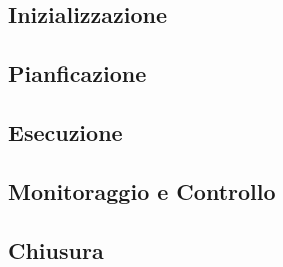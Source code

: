 \subsection{Inizializzazione}


\subsection{Pianficazione}


\subsection{Esecuzione}


\subsection{Monitoraggio e Controllo}


\subsection{Chiusura}